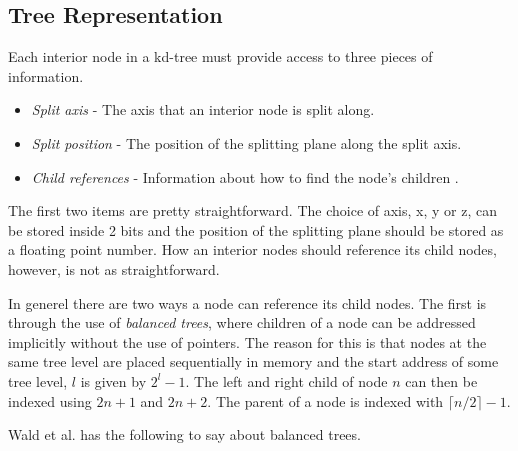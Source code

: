 


\subsection{Tree Representation}


Each interior node in a kd-tree must provide access to three pieces of
information.

\begin{itemize}
\item \textit{Split axis} - The axis that an interior node is split
  along.
\item \textit{Split position} - The position of the splitting plane
  along the split axis.
\item \textit{Child references} - Information about how to find the
  node's children .
\end{itemize}

The first two items are pretty straightforward. The choice of axis, x,
y or z, can be stored inside 2 bits and the position of the splitting
plane should be stored as a floating point number. How an interior
nodes should reference its child nodes, however, is not as
straightforward.

In generel there are two ways a node can reference its child
nodes. The first is through the use of \textit{balanced trees}, where
children of a node can be addressed implicitly without the use of
pointers. The reason for this is that nodes at the same tree level are
placed sequentially in memory and the start address of some tree
level, $l$ is given by $2^l-1$. The left and right child of node $n$
can then be indexed using $2n+1$ and $2n+2$. The parent of a node is
indexed with $\lceil n/2 \rceil - 1$.


Wald et al. has the following to say about
balanced trees.


